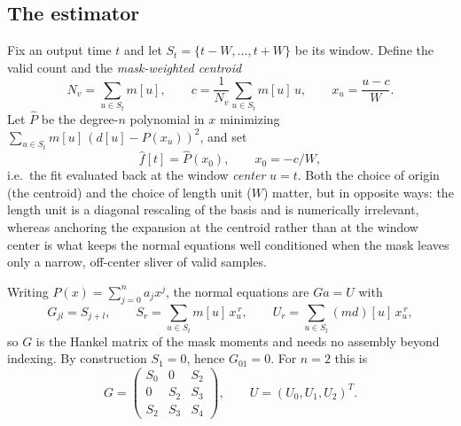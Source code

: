 \documentclass{article}
\numberwithin{equation}{section}   %
\begin{document}
\subsection{The estimator}
\label{sec:dt_estimator}

Fix an output time $t$ and let $S_t = \{t-W, \ldots, t+W\}$ be its window.  Define the valid count and the
{\em mask-weighted centroid}
\begin{equation}
N_v = \sum_{u \in S_t} m[u],
\qquad
c = \frac{1}{N_v}\sum_{u \in S_t} m[u]\, u,
\qquad
x_u = \frac{u - c}{W} .
\label{eq:dt_centroid}
\end{equation}
Let $\hat P$ be the degree-$n$ polynomial in $x$ minimizing $\sum_{u \in S_t} m[u]\,(d[u] - P(x_u))^2$, and set
\begin{equation}
\hat f[t] = \hat P(x_0), \qquad x_0 = -c/W,
\label{eq:dt_fhat}
\end{equation}
i.e.~the fit evaluated back at the window {\em center} $u = t$.  Both the choice of origin (the centroid) and
the choice of length unit ($W$) matter, but in opposite ways: the length unit is a diagonal rescaling of the
basis and is numerically irrelevant, whereas anchoring the expansion at the centroid rather than at the window
center is what keeps the normal equations well conditioned when the mask leaves only a narrow, off-center
sliver of valid samples.

Writing $P(x) = \sum_{j=0}^{n} a_j x^j$, the normal equations are $G a = U$ with
\begin{equation}
G_{jl} = S_{j+l},
\qquad
S_r = \sum_{u \in S_t} m[u]\, x_u^{\,r},
\qquad
U_r = \sum_{u \in S_t} (md)[u]\, x_u^{\,r},
\label{eq:dt_moments}
\end{equation}
so $G$ is the Hankel matrix of the mask moments and needs no assembly beyond indexing.
By construction $S_1 = 0$, hence $G_{01} = 0$.  For $n = 2$ this is
\begin{equation}
G = \begin{pmatrix} S_0 & 0 & S_2 \\ 0 & S_2 & S_3 \\ S_2 & S_3 & S_4 \end{pmatrix},
\qquad
U = (U_0, U_1, U_2)^T .
\label{eq:dt_G}
\end{equation}
\end{document}
